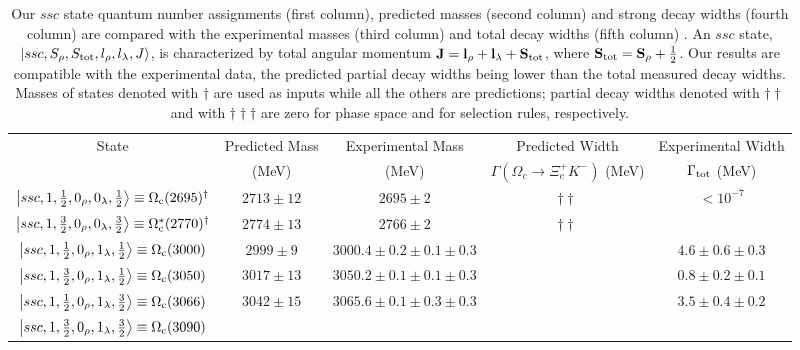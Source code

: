 \documentclass[twocolumn,superscriptaddress,preprintnumbers,nofootinbib]{revtex4}
\begin{document}
\begin{table*}[htbp]
\caption{Our $ssc$ state quantum number assignments (first column), predicted masses (second column) and strong decay widths (fourth column) are compared with the  experimental  masses (third column) and total decay widths (fifth column) \cite{Aaij:2017nav,Tanabashi:2018oca}. An $ssc$ state, $\left| ssc, S_{\rho}, S_{\rm tot}, l_{\rho}, l_{\lambda}, J \right\rangle$, is characterized by total angular momentum ${\bf J} = {\bf l}_{\rho}+{\bf l}_{\lambda} + {\bf S}_{\rm tot} $, where ${\bf S}_{\rm tot} = {\bf S}_{\rho}+\frac{1}{2}$. Our results are compatible with the experimental data, the predicted partial decay widths being lower than the total measured decay widths. Masses of states denoted  with $\dagger$ are used as inputs while all the others
are predictions; partial decay widths denoted with $\dagger  \dagger  $ and with  $\dagger  \dagger  \dagger $  are zero for phase space and for selection rules, respectively. }
\begin{tabular}{ccccc}
\hline
\hline
State & Predicted Mass & Experimental Mass & Predicted Width & Experimental Width\\
         & (MeV)                & (MeV)                      & $\Gamma(\Omega_c \rightarrow \Xi_c^{+}K^{-})$ (MeV) &  $\Gamma_{\rm tot}$  (MeV) \\
\hline
$\left| ssc,1, \frac{1}{2},0_{\rho},0_{\lambda}, \frac{1}{2} \right\rangle \equiv \Omega_{\rm c}(2695)^{\dagger}$   & 
$2713 \pm 12$ & $2695\pm2$ &  $\dagger \dagger $ &  $<10^{-7}$ \\
$\left| ssc,1, \frac{3}{2},0_{\rho},0_{\lambda}, \frac{3}{2} \right\rangle \equiv \Omega_{\rm c}^{*}(2770)^{\dagger}$   & 
 $2774\pm13$ &   $2766\pm2$ &$\dagger \dagger $  &  \\
$\left| ssc,1, \frac{1}{2},0_{\rho},1_{\lambda}, \frac{1}{2} \right\rangle \equiv \Omega_{\rm c}(3000)$   & 
$2999 \pm 9$ & $3000.4\pm0.2\pm0.1\pm0.3$ &   & $4.6\pm0.6\pm0.3$ \\
$\left| ssc,1, \frac{3}{2},0_{\rho},1_{\lambda},  \frac{1}{2} \right\rangle \equiv \Omega_{\rm c}(3050)$   &  $3017 \pm 13$   & $3050.2\pm0.1\pm0.1\pm0.3$ & 
  & $0.8\pm0.2\pm0.1$\\
$\left| ssc,1,  \frac{1}{2},0_{\rho},1_{\lambda}, \frac{3}{2} \right\rangle  \equiv \Omega_{\rm c}(3066)$  &  $3042 \pm 15$ & $3065.6\pm0.1\pm0.3\pm0.3$ &  & $3.5\pm0.4\pm0.2$ \\
$\left| ssc,1, \frac{3}{2},0_{\rho},1_{\lambda}, \frac{3}{2} \right\rangle  \equiv \Omega_{\rm c}(3090)$  & 

\end{tabular}
\end{table*}
\end{document}

